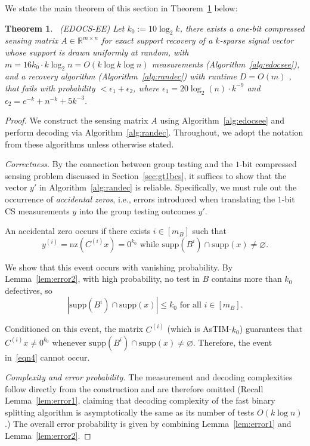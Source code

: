 \documentclass{article}
\newcommand{\xl}[1]{{\color{blue}#1}}
\newtheorem{theorem}{Theorem}[subsection]
\newcommand{\supp}{\mathrm{supp}}
\newcommand{\nz}{\mathrm{nz}}
\begin{document}
We state the main theorem of this section in Theorem~\ref{thm:ee} below: 
\begin{theorem}~\label{thm:ee}
    \emph{(EDOCS-EE)} Let $k_0:=10\log_2 k$, 
    there exists a one-bit compressed sensing matrix $A\in\mathbb{R}^{m\times n}$ for exact support recovery of a $k$-sparse signal vector whose support is drawn uniformly at random, with $m=16k_0 \cdot k\log_2 n=O( k\log k\log n)$ measurements (Algorithm~\ref{alg:edocsee}), and a recovery algorithm (Algorithm~\ref{alg:randec}) with runtime $D=O(m)$ , that fails with probability $<\epsilon_1+\epsilon_2$, where $\epsilon_1=20\log_2(n)\cdot k^{-9}$ and $\epsilon_2=e^{-k}+n^{-k}+5k^{-3}$.
\end{theorem}
\begin{proof}
   We construct the sensing matrix $A$ using Algorithm~\ref{alg:edocsee} and perform decoding via Algorithm~\ref{alg:randec}. Throughout, we adopt the notation from these algorithms unless otherwise stated.

\emph{Correctness.}
By the connection between group testing and the $1$-bit compressed sensing problem discussed in Section~\ref{sec:gt1bcs}, it suffices to show that the vector $y'$ in Algorithm~\ref{alg:randec} is reliable. Specifically, we must rule out the occurrence of \emph{accidental zeros}, i.e., errors introduced when translating the $1$-bit CS measurements $y$ into the group testing outcomes $y'$.

An accidental zero occurs if there exists $i \in [m_B]$ such that
\begin{equation}\label{eqn4}
    y^{(i)} = \nz(C^{(i)}x) = 0^{k_0}
    \text{ while }
    \supp(B^{i}) \cap \supp(x) \neq \varnothing.
\end{equation}

We show that this event occurs with vanishing probability. By Lemma~\ref{lem:error2}, with high probability, no test in $B$ contains more than $k_0$ defectives, so
\[
|\supp(B^{i}) \cap \supp(x)| \leq k_0
\text{ for all } i \in [m_B].
\]

Conditioned on this event, the matrix $C^{(i)}$ (which is AsTIM-$k_0$) guarantees that $C^{(i)}x \neq 0^{k_0}$ whenever $\supp(B^{i}) \cap \supp(x) \neq \varnothing$. Therefore, the event in~\eqref{eqn4} cannot occur.

\emph{Complexity and error probability.}
The measurement and decoding complexities follow directly from the construction and are therefore omitted (Recall Lemma~\ref{lem:error1}, claiming that decoding complexity of the fast binary splitting algorithm is asymptotically the same as its number of tests $O(k\log n)$.) The overall error probability is given by combining Lemma~\ref{lem:error1} and Lemma~\ref{lem:error2}.
\end{proof}
\end{document}

